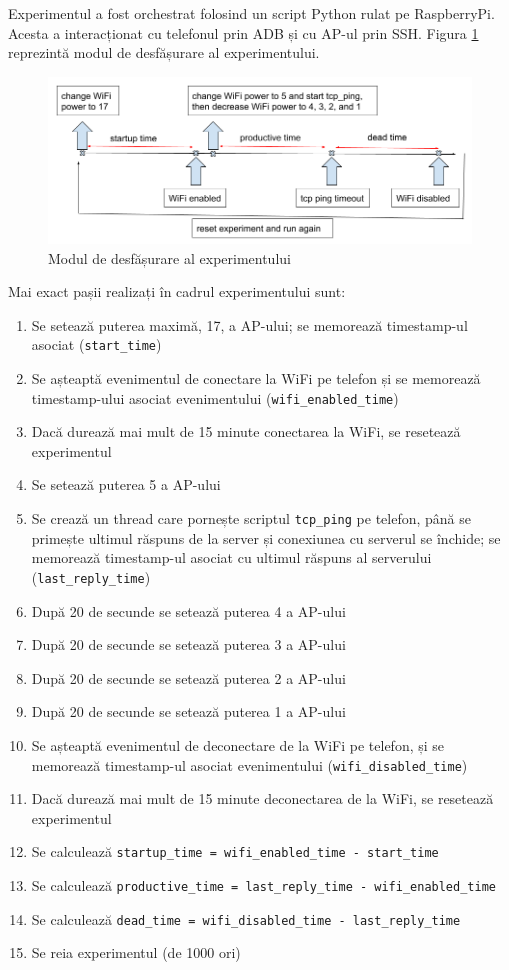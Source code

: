 Experimentul a fost orchestrat folosind un script Python rulat pe RaspberryPi. Acesta a interacționat cu telefonul prin ADB și cu AP-ul prin SSH. Figura \ref{fig:expdesign} reprezintă modul de desfășurare al experimentului. 

\begin{figure}[h!]
	\centering
	\includegraphics[scale=0.5]{figures/experiments/experiment_design.png}
	\caption{Modul de desfășurare al experimentului}
    	\label{fig:expdesign}
\end{figure}

Mai exact pașii realizați în cadrul experimentului sunt:
\begin{enumerate}
	\item Se setează puterea maximă, 17,  a AP-ului; se memorează timestamp-ul asociat (\texttt{start\_time})
	\item Se așteaptă evenimentul de conectare la WiFi pe telefon și se memorează timestamp-ului asociat evenimentului (\texttt{wifi\_enabled\_time})
	\item Dacă durează mai mult de 15 minute conectarea la WiFi, se resetează experimentul
	\item Se setează puterea 5 a AP-ului
	\item Se crează un thread care pornește scriptul \texttt{tcp\_ping} pe telefon, până se primește ultimul răspuns de la server și conexiunea cu serverul se închide; se memorează timestamp-ul asociat cu ultimul răspuns al serverului (\texttt{last\_reply\_time})
	\item După 20 de secunde se setează puterea 4 a AP-ului
	\item După 20 de secunde se setează puterea 3 a AP-ului
	\item După 20 de secunde se setează puterea 2 a AP-ului
	\item După 20 de secunde se setează puterea 1 a AP-ului
	\item Se așteaptă evenimentul de deconectare de la WiFi pe telefon, și se memorează timestamp-ul asociat evenimentului (\texttt{wifi\_disabled\_time})
	\item Dacă durează mai mult de 15 minute deconectarea de la WiFi, se resetează experimentul
	\item Se calculează \texttt{startup\_time = wifi\_enabled\_time - start\_time}
	\item Se calculează \texttt{productive\_time = last\_reply\_time - wifi\_enabled\_time}
	\item Se calculează \texttt{dead\_time = wifi\_disabled\_time - last\_reply\_time}
	\item Se reia experimentul (de 1000 ori)
\end{enumerate}

